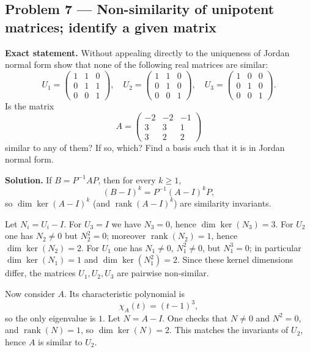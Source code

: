 \documentclass[12pt,a4paper]{article}
\theoremstyle{plain}
\theoremstyle{definition}      %
\begin{document}
\subsection*{Problem 7 — Non-similarity of unipotent matrices; identify a given matrix}

\textbf{Exact statement.}
Without appealing directly to the uniqueness of Jordan normal form show that none of the following real matrices are similar:
\[
U_1=\begin{pmatrix}1&1&0\\0&1&1\\0&0&1\end{pmatrix},\quad
U_2=\begin{pmatrix}1&1&0\\0&1&0\\0&0&1\end{pmatrix},\quad
U_3=\begin{pmatrix}1&0&0\\0&1&0\\0&0&1\end{pmatrix}.
\]
Is the matrix
\[
A=\begin{pmatrix}-2&-2&-1\\ 3&3&1\\ 3&2&2\end{pmatrix}
\]
similar to any of them? If so, which? Find a basis such that it is in Jordan normal form.

\textbf{Solution.}
If $B=P^{-1}AP$, then for every $k\ge 1$,
\[
(B-I)^k=P^{-1}(A-I)^kP,
\]
so $\dim\ker(A-I)^k$ (and $\operatorname{rank}(A-I)^k$) are similarity invariants.

Let $N_i=U_i-I$.
For $U_3=I$ we have $N_3=0$, hence $\dim\ker(N_3)=3$.
For $U_2$ one has $N_2\neq 0$ but $N_2^2=0$; moreover $\operatorname{rank}(N_2)=1$, hence $\dim\ker(N_2)=2$.
For $U_1$ one has $N_1\neq 0$, $N_1^2\neq 0$, but $N_1^3=0$; in particular $\dim\ker(N_1)=1$ and $\dim\ker(N_1^2)=2$.
Since these kernel dimensions differ, the matrices $U_1,U_2,U_3$ are pairwise non-similar.

Now consider $A$. Its characteristic polynomial is
\[
\chi_A(t)=(t-1)^3,
\]
so the only eigenvalue is $1$. Let $N=A-I$. One checks that $N\neq 0$ and $N^2=0$, and $\operatorname{rank}(N)=1$,
so $\dim\ker(N)=2$. This matches the invariants of $U_2$, hence $A$ is similar to $U_2$.
\end{document}
